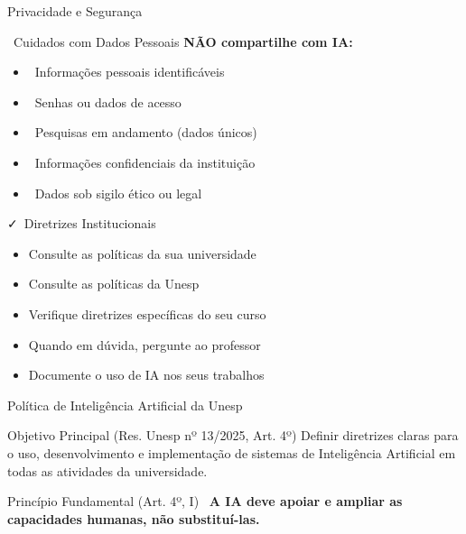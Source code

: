 \documentclass[aspectratio=169,12pt]{beamer}
\begin{document}
\begin{frame}{Privacidade e Segurança}
    \begin{alertblock}{\faUserShield\, Cuidados com Dados Pessoais}
        \textbf{NÃO compartilhe com IA:}
        \begin{itemize}
            \item \faIdCard\, Informações pessoais identificáveis
            \item \faKey\, Senhas ou dados de acesso
            \item \faFile\, Pesquisas em andamento (dados únicos)
            \item \faUniversity\, Informações confidenciais da instituição
            \item \faGavel\, Dados sob sigilo ético ou legal
        \end{itemize}
    \end{alertblock}
    
    \begin{block}{\faCheck\, Diretrizes Institucionais}
        \begin{itemize}
            \item Consulte as políticas da sua universidade
            \item Consulte as políticas da Unesp
            \item Verifique diretrizes específicas do seu curso
            \item Quando em dúvida, pergunte ao professor
            \item Documente o uso de IA nos seus trabalhos
        \end{itemize}
    \end{block}
\end{frame}

\begin{frame}{Política de Inteligência Artificial da Unesp}
    \begin{block}{Objetivo Principal (Res. Unesp nº 13/2025, Art. 4º)}
        Definir diretrizes claras para o uso, desenvolvimento e implementação de sistemas de Inteligência Artificial em todas as atividades da universidade.
    \end{block}
    
    \begin{exampleblock}{Princípio Fundamental (Art. 4º, I)}
        \centering
        \faUsers\, \textbf{A IA deve apoiar e ampliar as capacidades humanas, não substituí-las.}
    \end{exampleblock}
\end{frame}
\end{document}
